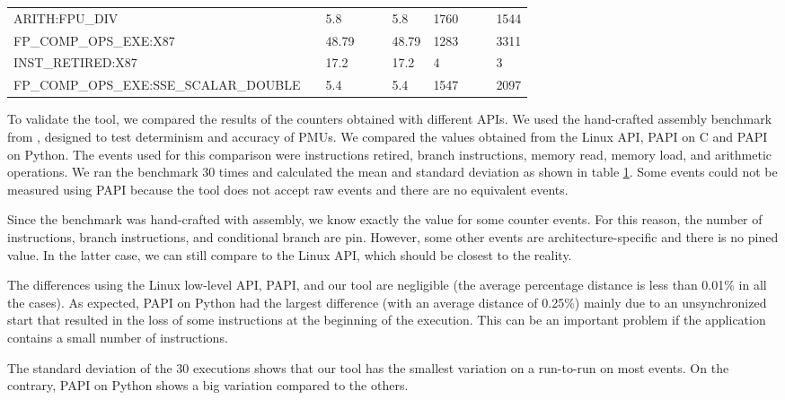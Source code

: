 \begin{table}[H]
{\begin{tabular}{llllllllll}
			ARITH:FPU\_DIV                         &              & 5.8       &      &             & 5.8     & 1760      &      &             & 1544   \\
			FP\_COMP\_OPS\_EXE:X87                 &              & 48.79     &      &             & 48.79   & 1283      &      &             & 3311   \\
			INST\_RETIRED:X87                      &              & 17.2      &      &             & 17.2    & 4         &      &             & 3      \\
			FP\_COMP\_OPS\_EXE:SSE\_SCALAR\_DOUBLE &              & 5.4       &      &             & 5.4     & 1547      &      &             & 2097   \\ \hline
		\end{tabular}
	}
	\label{tab:counters}
\end{table}

To validate the tool, we compared the results of the counters obtained with different APIs. 
We used the hand-crafted assembly benchmark from \cite{Weaver2013Non-determinismImplementations}, designed to test determinism and accuracy of PMUs.
We compared the values obtained from the Linux API, PAPI on C and PAPI on Python. 
The events used for this comparison were instructions retired, branch instructions, memory read, memory load, and arithmetic operations.
We ran the benchmark 30 times and calculated the mean and standard deviation as shown in table \ref{tab:counters}. Some events could not be measured using PAPI because the tool does not accept raw events and there are no equivalent events.

Since the benchmark was hand-crafted with assembly, we know exactly the value for some counter events. 
For this reason, the number of instructions, branch instructions, and conditional branch are pin. However, some other events are architecture-specific and there is no pined value. 
In the latter case, we can still compare to the Linux API, which should be closest to the reality.

The differences using the Linux low-level API, PAPI, and our tool are negligible (the average percentage distance is less than 0.01\% in all the cases). 
As expected, PAPI on Python had the largest difference (with an average distance of 0.25\%) mainly due to an unsynchronized start that resulted in the loss of some instructions at the beginning of the execution. 
This can be an important problem if the application contains a small number of instructions.

The standard deviation of the 30 executions shows that our tool has the smallest variation on a run-to-run on most events. On the contrary, PAPI on Python shows a big variation compared to the others.

